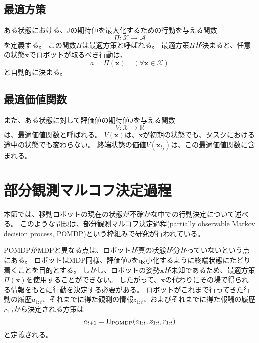 \subsection{最適方策}
ある状態における、Jの期待値を最大化するための行動を与える関数
\begin{equation}
\label{policy}
  \Pi : \mathcal{X} \rightarrow \mathcal{A}
\end{equation}
を定義する。
この関数$\Pi$は最適方策と呼ばれる。
最適方策$\Pi$が決まると、任意の状態$\bm{x}$でロボットが取るべき行動は、
\begin{equation}
\label{oprimal action}
  a = \Pi(\bm{x}) \;\;\;\; (\forall \bm{x} \in \mathcal{X})
\end{equation}
と自動的に決まる。

\subsection{最適価値関数}
また、ある状態に対して評価値の期待値$J$を与える関数
\begin{equation}
\label{value function}
  V : \mathcal{X} \rightarrow \mathbb{R}
\end{equation}
は、最適価値関数と呼ばれる。
$V(\bm{x})$は、$\bm{x}$が初期の状態でも、タスクにおける途中の状態でも変わらない。
終端状態の価値$V(\bm{x}_{t_{f}})$は、この最適価値関数に含まれる。


\section{部分観測マルコフ決定過程} \label{section:pomdp}
本節では、移動ロボットの現在の状態が不確かな中での行動決定について述べる。
このような問題は、部分観測マルコフ決定過程(partially observable Markov decision process, POMDP)という枠組みで研究が行われている。

POMDPがMDPと異なる点は、ロボットが真の状態が分かっていないという点にある。
ロボットはMDP同様、評価値$J$を最小化するように終端状態にたどり着くことを目的とする。
しかし、ロボットの姿勢$\bm{x}$が未知であるため、最適方策$\Pi(\bm{x})$を使用することができない。
したがって、$\bm{x}$の代わりにその場で得られる情報をもとに行動を決定する必要がある。
ロボットがこれまで行ってきた行動の履歴$a_{1:t}$、それまでに得た観測の情報$z_{1:t}$、およびそれまでに得た報酬の履歴$r_{1:t}$から決定される方策は
\begin{equation}
\label{policy pomdp}
  a_{t+1} = \Pi_{\rm POMDP} (a_{1:t}, \bm{z}_{1:t}, r_{1:t})
\end{equation}
と定義される。

